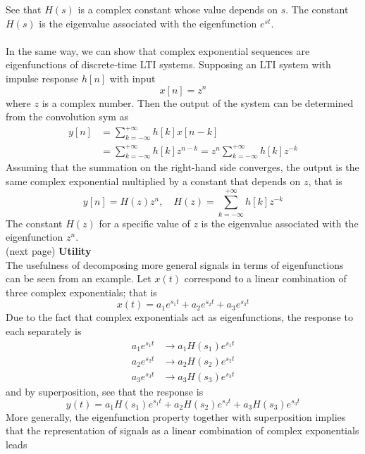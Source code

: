 \documentclass{report}
\begin{document}
See that $H(s)$ is a complex constant whose value depends on $s$. The constant $H(s)$ is the eigenvalue associated with the eigenfunction $e^{st}$.\\
\vspace{1mm}\\
In the same way, we can show that complex exponential sequences are eigenfunctions of discrete-time LTI systems. Supposing an LTI system with impulse response $h[n]$ with input
\begin{equation*}
x[n]=z^n
\end{equation*}
where $z$ is a complex number. Then the output of the system can be determined from the convolution sym as
\begin{align*}
y[n]&=\sum^{+\infty}_{k=-\infty}h[k]x[n-k]\\
&=\sum^{+\infty}_{k=-\infty}h[k]z^{n-k}=z^n\sum^{+\infty}_{k=-\infty}h[k]z^{-k}
\end{align*}
Assuming that the summation on the right-hand side converges, the output is the same complex exponential multiplied by a constant that depends on $z$, that is
\begin{equation*}
y[n]=H(z)z^n,\quad H(z)=\sum^{+\infty}_{k=-\infty}h[k]z^{-k}
\end{equation*}
The constant $H(z)$ for a specific value of $z$ is the eigenvalue associated with the eigenfunction
$z^n$.\\
(next page)\newpage
\noindent\textbf{Utility}\\
The usefulness of decomposing more general signals in terms of eigenfunctions can be seen from an example. Let $x(t)$ correspond to a 
linear combination of three complex exponentials; that is
\begin{equation*}
x(t)=a_1e^{s_1t}+a_2e^{s_2t}+a_3e^{s_3t}
\end{equation*}
Due to the fact that complex exponentials act as eigenfunctions, the response to each separately is
\begin{align*}
a_1e^{s_1t}&\to a_1H(s_1)e^{s_1t}\\
a_2e^{s_2t}&\to a_2H(s_2)e^{s_2t}\\
a_3e^{s_3t}&\to a_3H(s_3)e^{s_3t}
\end{align*}
and by superposition, see that the response is
\begin{equation*}
y(t)=a_1H(s_1)e^{s_1t}+a_2H(s_2)e^{s_2t}+a_3H(s_3)e^{s_3t}
\end{equation*}
More generally, the eigenfunction property together with superposition implies that the representation of signals as a linear combination of complex exponentials leads
\end{document}
